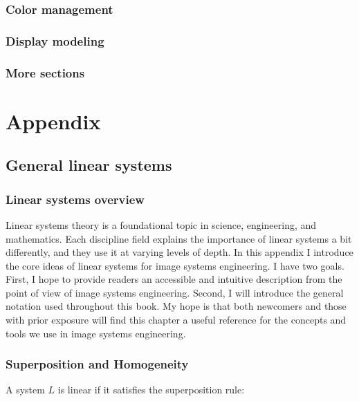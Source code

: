 \documentclass[
  letterpaper,
]{book}
\begin{document}
\section{Color management}\label{color-management}

\section{Display modeling}\label{display-modeling}

\section{More sections}\label{more-sections}

\part{Appendix}

\chapter{General linear systems}\label{sec-appendix-linear-systems}

\section{Linear systems overview}\label{linear-systems-overview}

Linear systems theory is a foundational topic in science, engineering,
and mathematics. Each discipline field explains the importance of linear
systems a bit differently, and they use it at varying levels of depth.
In this appendix I introduce the core ideas of linear systems for image
systems engineering. I have two goals. First, I hope to provide readers
an accessible and intuitive description from the point of view of image
systems engineering. Second, I will introduce the general notation used
throughout this book. My hope is that both newcomers and those with
prior exposure will find this chapter a useful reference for the
concepts and tools we use in image systems engineering.

\section{Superposition and Homogeneity}\label{sec-ls-superposition}

A system \(L\) is linear if it satisfies the superposition rule:
\end{document}
